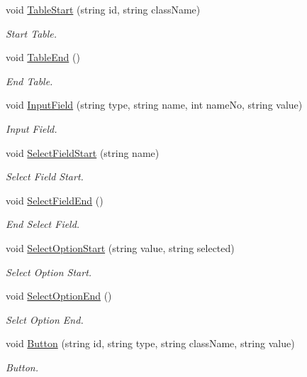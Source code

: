 \begin{DoxyCompactItemize}
void \hyperlink{classHTMLTags_a9d4bc37c7d615bc1d7f7c738dae48ad3}{Table\-Start} (string id, string class\-Name)
\begin{DoxyCompactList}\small\item\em Start Table. \end{DoxyCompactList}\item 
void \hyperlink{classHTMLTags_a0655d9f70a8c1a61c406280d8fb9df7a}{Table\-End} ()
\begin{DoxyCompactList}\small\item\em End Table. \end{DoxyCompactList}\item 
void \hyperlink{classHTMLTags_a705aef36f0847c2a5f10a5df8e079ce8}{Input\-Field} (string type, string name, int name\-No, string value)
\begin{DoxyCompactList}\small\item\em Input Field. \end{DoxyCompactList}\item 
void \hyperlink{classHTMLTags_adb6e7ef0a1320dbf6d4acbe1ea3e418f}{Select\-Field\-Start} (string name)
\begin{DoxyCompactList}\small\item\em Select Field Start. \end{DoxyCompactList}\item 
void \hyperlink{classHTMLTags_adde967a90e03f4b5168b9bffd319980b}{Select\-Field\-End} ()
\begin{DoxyCompactList}\small\item\em End Select Field. \end{DoxyCompactList}\item 
void \hyperlink{classHTMLTags_a372570979ccc675e0ed752fe272e3cd6}{Select\-Option\-Start} (string value, string selected)
\begin{DoxyCompactList}\small\item\em Select Option Start. \end{DoxyCompactList}\item 
void \hyperlink{classHTMLTags_ae312980d20e3dea0469fdcb730fb975e}{Select\-Option\-End} ()
\begin{DoxyCompactList}\small\item\em Selct Option End. \end{DoxyCompactList}\item 
void \hyperlink{classHTMLTags_ab6dbb027d808e7b708a4ece7e911ceee}{Button} (string id, string type, string class\-Name, string value)
\begin{DoxyCompactList}\small\item\em Button. \end{DoxyCompactList}\end{DoxyCompactItemize}
